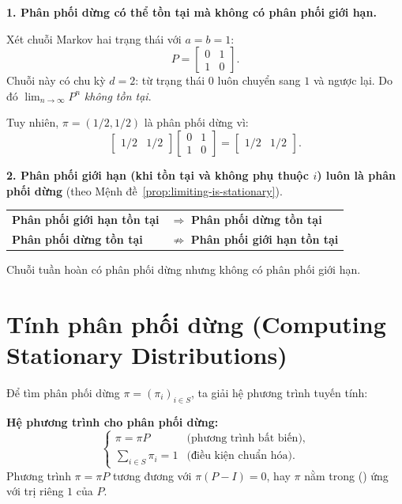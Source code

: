 \textbf{1. Phân phối dừng có thể tồn tại mà không có phân phối giới hạn.}

\begin{example}
Xét chuỗi Markov hai trạng thái với $a = b = 1$:
\[
  P = \begin{bmatrix} 0 & 1 \\ 1 & 0 \end{bmatrix}.
\]
Chuỗi này có chu kỳ $d = 2$: từ trạng thái $0$ luôn chuyển sang $1$ và ngược lại.
Do đó $\lim_{n\to\infty} P^n$ \emph{không tồn tại}.

Tuy nhiên, $\pi = (1/2, 1/2)$ là phân phối dừng vì:
\[
  \begin{bmatrix} 1/2 & 1/2 \end{bmatrix}
  \begin{bmatrix} 0 & 1 \\ 1 & 0 \end{bmatrix}
  = \begin{bmatrix} 1/2 & 1/2 \end{bmatrix}.
\]
\end{example}

\textbf{2. Phân phối giới hạn (khi tồn tại và không phụ thuộc $i$) luôn là phân phối dừng}
(theo Mệnh đề~\ref{prop:limiting-is-stationary}).

\begin{tomtat}
\begin{center}
\begin{tabular}{ll}
  \textbf{Phân phối giới hạn tồn tại} & $\Rightarrow$ \textbf{Phân phối dừng tồn tại} \\
  \textbf{Phân phối dừng tồn tại} & $\not\Rightarrow$ \textbf{Phân phối giới hạn tồn tại}
\end{tabular}
\end{center}
Chuỗi tuần hoàn có phân phối dừng nhưng không có phân phối giới hạn.
\end{tomtat}

\section{Tính phân phối dừng (Computing Stationary Distributions)}
\label{sec:computing-stationary}

Để tìm phân phối dừng $\pi = (\pi_i)_{i\in S}$, ta giải hệ phương trình tuyến tính:

\begin{congthuc}
\textbf{Hệ phương trình cho phân phối dừng:}
\[
  \begin{cases}
    \pi = \pi P & \text{(phương trình bất biến)}, \\
    \displaystyle\sum_{i\in S} \pi_i = 1 & \text{(điều kiện chuẩn hóa)}.
  \end{cases}
\]
Phương trình $\pi = \pi P$ tương đương với $\pi (P - I) = 0$, hay $\pi$ nằm trong
 () ứng với trị riêng $1$ của $P$.
\end{congthuc}


